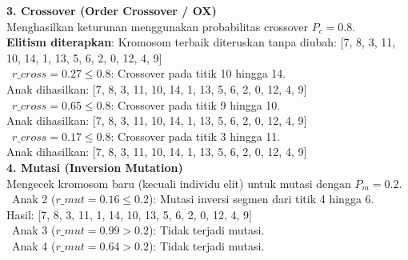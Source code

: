 \documentclass[12pt]{article}
\begin{document}
\vspace{0.5cm}
\noindent\textbf{3. Crossover (Order Crossover / OX)}\\Menghasilkan keturunan menggunakan probabilitas crossover $P_c = 0.8$.\\
\textbf{Elitism diterapkan}: Kromosom terbaik diteruskan tanpa diubah: [7, 8, 3, 11, 10, 14, 1, 13, 5, 6, 2, 0, 12, 4, 9]\\
\textbullet\ $r\_cross = 0.27 \le 0.8$: Crossover pada titik 10 hingga 14.\\ Anak dihasilkan: [7, 8, 3, 11, 10, 14, 1, 13, 5, 6, 2, 0, 12, 4, 9]\\
\textbullet\ $r\_cross = 0.65 \le 0.8$: Crossover pada titik 9 hingga 10.\\ Anak dihasilkan: [7, 8, 3, 11, 10, 14, 1, 13, 5, 6, 2, 0, 12, 4, 9]\\
\textbullet\ $r\_cross = 0.17 \le 0.8$: Crossover pada titik 3 hingga 11.\\ Anak dihasilkan: [7, 8, 3, 11, 10, 14, 1, 13, 5, 6, 2, 0, 12, 4, 9]\\

\vspace{0.5cm}
\noindent\textbf{4. Mutasi (Inversion Mutation)}\\Mengecek kromosom baru (kecuali individu elit) untuk mutasi dengan $P_m = 0.2$.\\
\textbullet\ Anak 2 ($r\_mut = 0.16 \le 0.2$): Mutasi inversi segmen dari titik 4 hingga 6.\\ Hasil: [7, 8, 3, 11, 1, 14, 10, 13, 5, 6, 2, 0, 12, 4, 9]\\
\textbullet\ Anak 3 ($r\_mut = 0.99 > 0.2$): Tidak terjadi mutasi.\\
\textbullet\ Anak 4 ($r\_mut = 0.64 > 0.2$): Tidak terjadi mutasi.\\
\vspace{1cm}
\end{document}
